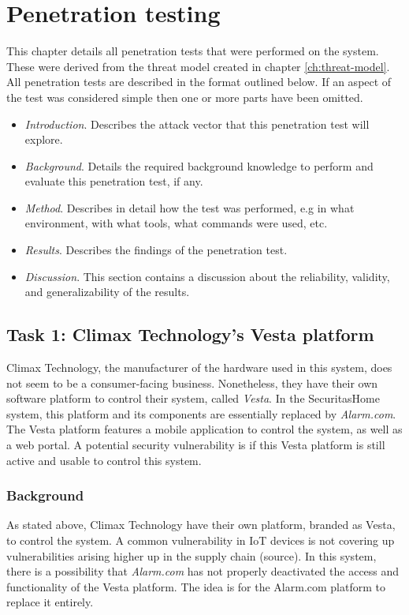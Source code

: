 \chapter{Penetration testing} \label{ch:pentesting}
This chapter details all penetration tests that were performed on the system. These were derived from the threat model created in chapter \ref{ch:threat-model}. All penetration tests are described in the format outlined below. If an aspect of the test was considered simple then one or more parts have been omitted.
\begin{itemize}
    \item \textit{Introduction}. Describes the attack vector that this penetration test will explore.
    \item \textit{Background}. Details the required background knowledge to perform and evaluate this penetration test, if any.
    \item \textit{Method}. Describes in detail how the test was performed, e.g in what environment, with what tools, what commands were used, etc.
    \item \textit{Results}. Describes the findings of the penetration test.
    \item \textit{Discussion}. This section contains a discussion about the reliability, validity, and generalizability of the results.
\end{itemize}

\section{Task 1: Climax Technology's Vesta platform} \label{ch:pentesting:vesta}
Climax Technology, the manufacturer of the hardware used in this system, does not seem to be a consumer-facing business. Nonetheless, they have their own software platform to control their system, called \textit{Vesta}. In the SecuritasHome system, this platform and its components are essentially replaced by \textit{Alarm.com}. The Vesta platform features a mobile application to control the system, as well as a web portal. A potential security vulnerability is if this Vesta platform is still active and usable to control this system.

\subsection{Background}
As stated above, Climax Technology have their own platform, branded as Vesta, to control the system. A common vulnerability in IoT devices is not covering up vulnerabilities arising higher up in the supply chain (\todo source). In this system, there is a possibility that \textit{Alarm.com} has not properly deactivated the access and functionality of the Vesta platform. The idea is for the Alarm.com platform to replace it entirely.

